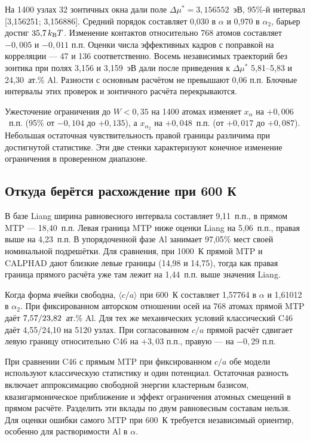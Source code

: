 \documentclass[11pt,a4paper]{article}
\begin{document}
На 1400 узлах 32 зонтичных окна дали поле
\(\Delta\mu^*=3{,}156552\)~эВ, 95\%-й интервал [3,156251; 3,156886].
Средний порядок составляет 0,030 в \(\alpha\) и 0,970 в \(\alpha_2\),
барьер достиг \(35{,}7\,k_{\rm B}T\). Изменение контактов относительно
768 атомов составляет \(-0{,}005\) и \(-0{,}011\) п.п. Оценки числа
эффективных кадров с поправкой на корреляции --- 47 и 136 соответственно.
Восемь независимых траекторий без зонтика при полях 3,156 и 3,159~эВ
дали после приведения к \(\Delta\mu^*\) 5,81--5,83 и 24,30~ат.\% Al.
Разности с основным расчётом не превышают 0,06 п.п. Блочные интервалы
этих проверок и зонтичного расчёта перекрываются.

Ужесточение ограничения до \(W<0{,}35\) на 1400 атомах изменяет
\(x_\alpha\) на \(+0{,}006\)~п.п. (95\% от \(-0{,}104\) до \(+0{,}135\)),
а \(x_{\alpha_2}\) на \(+0{,}048\)~п.п. (от \(+0{,}017\) до \(+0{,}087\)).
Небольшая остаточная чувствительность правой границы различима
при достигнутой статистике. Эти две стенки характеризуют конечное
изменение ограничения в проверенном диапазоне.

\subsection*{Откуда берётся расхождение при 600 К}
В базе Liang ширина равновесного интервала составляет 9,11~п.п.,
в прямом MTP --- 18,40~п.п. Левая граница MTP ниже оценки Liang на 5,06~п.п.,
правая выше на 4,23~п.п. В упорядоченной фазе Al занимает 97,05\% мест
своей номинальной подрешётки. Для сравнения, при
1000~К прямой MTP и CALPHAD дают близкие левые границы
(14,98 и 14,75), тогда как правая граница прямого расчёта уже там
лежит на 1,44~п.п. выше значения Liang.

Когда форма ячейки свободна, \(\langle c/a\rangle\) при 600~К составляет
1,57764 в \(\alpha\) и 1,61012 в \(\alpha_2\). При фиксированном
авторском отношении осей на 768 атомах прямой MTP даёт
\(7{,}57/23{,}82\)~ат.\% Al. Для тех же механических условий
классический C46 даёт 4,55/24,10 на 5120 узлах. При согласованном
\(c/a\) прямой расчёт сдвигает левую границу относительно C46 на
\(+3{,}03\) п.п., правую --- на \(-0{,}29\) п.п.

При сравнении C46 с прямым MTP при фиксированном \(c/a\) обе модели
используют классическую статистику и один потенциал. Остаточная
разность включает аппроксимацию свободной энергии кластерным базисом,
квазигармоническое приближение и эффект ограничения атомных смещений
в прямом расчёте. Разделить эти вклады по двум равновесным составам
нельзя. Для оценки ошибки самого MTP при 600~К требуется независимый
ориентир, особенно для растворимости Al в \(\alpha\).
\end{document}
